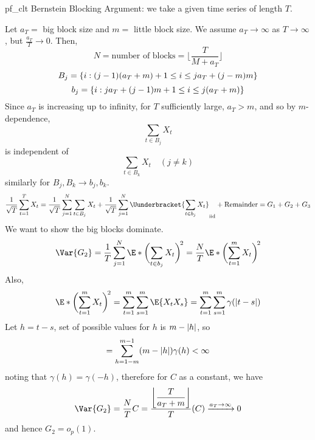 \begin{Proof}{}{pf_clt}
    Bernstein Blocking Argument: we take a given time series of length $ T $.

    Let $ a_T= $ big block size and $ m= $ little block size.
    We assume $ a_T\to\infty $ as $ T\to\infty $, but $ \displaystyle \frac{a_T}{T}\to 0 $.
    Then,
    \[ N=\text{number of blocks}=\biggl\lfloor \frac{T}{M+a_T} \biggr\rfloor \]
    \[ B_j=\{i:(j-1)(a_T+m)+1\le i\le j a_T+(j-m)m\} \]
    \[ b_j=\{i:j a_T+(j-1)m+1\le i\le j(a_T+m)\} \]
    Since $ a_T $ is increasing up to infinity, for $ T $
    sufficiently large, $ a_T>m $, and so
    by $ m $-dependence,
    \[ \sum_{t\in B_j}X_t  \]
    is independent of
    \[ \sum_{t\in B_k}X_t\quad(j\ne k)  \]
    similarly for $ B_j,B_k\to b_j,b_k $.
    \[ \frac{1}{\sqrt{T}}\sum_{t=1}^{T} X_t=\frac{1}{\sqrt{T}}
        \sum_{j=1}^{N}\sum_{t\in B_j}X_t+\frac{1}{\sqrt{T}} \sum_{j=1}^{N}
        \Uunderbracket{\sum_{t\in b_j}X_t}_{\text{iid}}+\text{Remainder}=G_1+G_2+G_3    \]
    We want to show the big blocks dominate.
    \[ \Var{G_2}=\frac{1}{T}
        \sum_{j=1}^{N}\E*{\biggl(\sum_{t\in b_j}X_t \biggr)^{\!2}}=
        \frac{N}{T}\E*{\biggl(\sum_{t=1}^{m} X_t\biggr)^{\!2}} \]
    Also,
    \[ \E*{\biggl(\sum_{t=1}^{m} X_t\biggr)^{\!2}}=\sum_{t=1}^{m} \sum_{s=1}^{m} \E{X_t X_s}=
        \sum_{t=1}^{m} \sum_{s=1}^{m}\gamma(\abs{t-s})  \]
    Let $ h=t-s $, set of possible values for $ h $ is $ m-\lvert h\rvert $, so
    \[ =\sum_{h=1-m}^{m-1} (m-\lvert h\rvert)\gamma(h)<\infty \]
    noting that $ \gamma(h)=\gamma(-h) $, therefore for $ C $ as a constant, we have
    \[ \Var{G_2}=\frac{N}{T}
        C=\frac{\displaystyle \biggl\lfloor \frac{T}{a_T+m} \biggr\rfloor}{T}(C)\xrightarrow{a_T\to\infty}0  \]
    and hence $ G_2=o_p(1) $.


\end{Proof}
